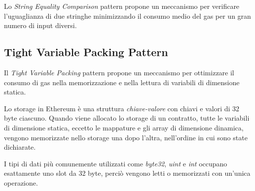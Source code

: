 {{		Lo \textit{String Equality Comparison} pattern propone un meccanismo per verificare l'uguaglianza di due stringhe minimizzando il consumo medio del gas per un gran numero di input diversi.
		\begin{table}[H]
			\centering
			\caption{Specifiche del String Equality Comparison Pattern}
		\end{table}
	}
	{\subsection{Tight Variable Packing Pattern}
	Il \textit{Tight Variable Packing} pattern propone un meccanismo per ottimizzare il consumo di gas nella memorizzazione e nella lettura di variabili di dimensione statica.\par
	Lo storage in Ethereum è una struttura \textit{chiave-valore} con chiavi e valori di 32 byte ciascuno. Quando viene allocato lo storage di un contratto, tutte le variabili di dimensione statica, eccetto le mappature e gli array di dimensione dinamica, vengono memorizzate nello storage una dopo l'altra, nell'ordine in cui sono state dichiarate.\par I tipi di dati più comunemente utilizzati come \textit{byte32}, \textit{uint} e \textit{int} occupano esattamente uno slot da 32 byte, perciò vengono letti o memorizzati con un'unica operazione.\par
}}
